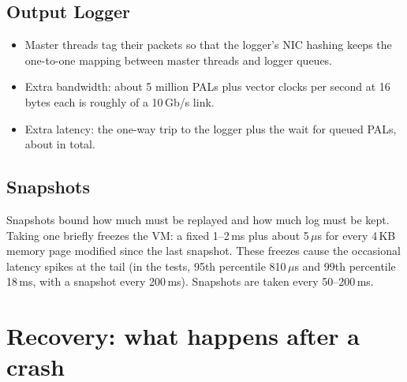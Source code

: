 \subsection{Output Logger}
\begin{itemize}
  \item Master threads tag their packets so that the logger's NIC hashing keeps the one-to-one mapping between master threads and logger queues.
  \item Extra bandwidth: about 5 million PALs plus vector clocks per second at 16 bytes each is roughly  of a 10\,Gb/s link.
  \item Extra latency: the one-way trip to the logger plus the wait for queued PALs, about  in total.
\end{itemize}

\subsection{Snapshots}
Snapshots bound how much must be replayed and how much log must be kept. Taking one briefly freezes the VM: a fixed 1--2\,ms plus about
5\,$\mu$s for every 4\,KB memory page modified since the last snapshot. These freezes cause the occasional latency spikes at the tail
(in the tests, 95th percentile 810\,$\mu$s and 99th percentile 18\,ms, with a snapshot every 200\,ms). Snapshots are taken every
50--200\,ms.

\section{Recovery: what happens after a crash}

